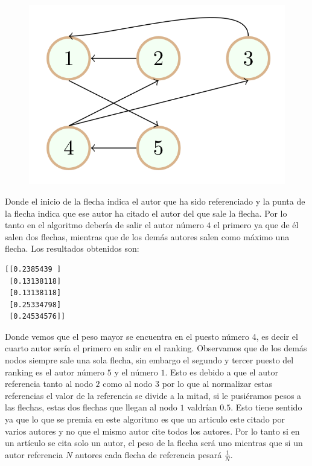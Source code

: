 \documentclass[size=a4, parskip=half, titlepage=false, toc=flat, toc=bib, 12pt]{scrartcl}
\theoremstyle{theorem-style}
\theoremstyle{definition-style}
\theoremstyle{remark-style}
\theoremstyle{example-style}
\theoremstyle{definition-style}
\theoremstyle{remark-style}
\begin{document}
\begin{figure}[H]
\centering
\includegraphics[scale=0.5]{./img/grafoejemplo}
\end{figure}
Donde el inicio de la flecha indica el autor que ha sido referenciado y la punta de la flecha indica
que ese autor ha citado el autor del que sale la flecha. Por lo tanto en el algoritmo debería de salir
el autor número $4$ el primero ya que de él salen dos flechas, mientras que de los demás autores salen
como máximo una flecha. Los resultados obtenidos son:

\begin{verbatim}
[[0.2385439 ]
 [0.13138118]
 [0.13138118]
 [0.25334798]
 [0.24534576]]
\end{verbatim}

Donde vemos que el peso mayor se encuentra en el puesto número 4, es decir el cuarto autor sería el
primero en salir en el ranking. Observamos que de los demás nodos siempre sale una sola flecha, sin
embargo el segundo y tercer puesto del ranking es el autor número $5$ y el número $1$. Esto es debido
a que el autor referencia tanto al nodo $2$ como al nodo $3$ por lo que al normalizar estas
referencias el valor de la referencia se divide a la mitad, si le pusiéramos pesos a las flechas,
estas dos flechas que llegan al nodo $1$ valdrían $0.5$. Esto tiene sentido ya que lo que se premia
en este algoritmo es que un articulo este citado por varios autores y no que el mismo autor cite todos
los autores. Por lo tanto si en un artículo se cita solo un autor, el peso de la flecha será uno
mientras que si un autor referencia $N$ autores cada flecha de referencia pesará $\frac{1}{N}$.
\end{document}
